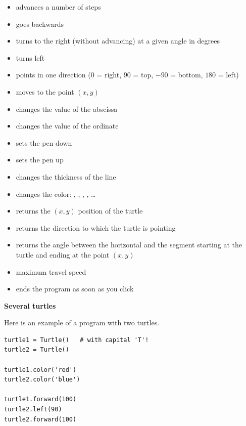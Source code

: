 \documentclass[11pt,class=report,crop=false]{standalone}
\begin{document}
\begin{itemize}
  \item {} advances a number of steps
  \item {} goes backwards
  \item {} turns to the right (without advancing) at a given angle in degrees
  \item {} turns left
  \item {} points in one direction ($0$ = right, $90$ = top, $-90$ = bottom, $180$ = left)
  \item {} moves to the point $(x,y)$
  \item {} changes the value of the abscissa
  \item {} changes the value of the ordinate
  
  
  \item {} sets the pen down
  \item {} sets the pen up
  \item {} changes the thickness of the line
  \item {} changes the color: , , , , \ldots
  
  \item {} returns the $(x,y)$ position of the turtle
  \item {} returns the direction  to which the turtle is pointing
  \item {} returns the angle between the horizontal and the segment starting at the turtle and ending at the point $(x,y)$
  \item {} \quad maximum travel speed  
  \item {} ends the program as soon as you click
\end{itemize}

\bigskip

\textbf{Several turtles}

Here is an example of a program with two turtles.
\begin{lstlisting}
turtle1 = Turtle()   # with capital 'T'!
turtle2 = Turtle()

turtle1.color('red')
turtle2.color('blue')

turtle1.forward(100)
turtle2.left(90)
turtle2.forward(100)
\end{lstlisting}
\end{document}
